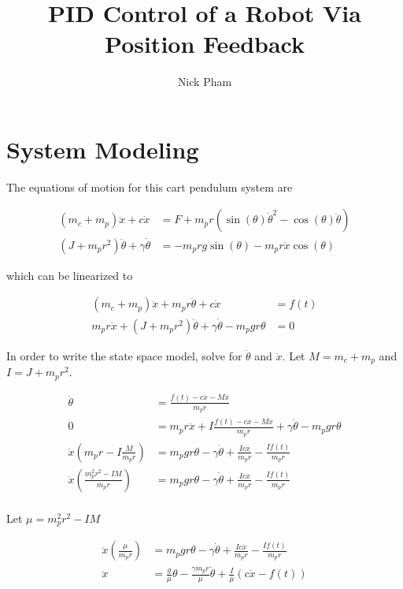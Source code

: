 \documentclass{journal}
\title{PID Control of a Robot Via Position Feedback}
\author{Nick Pham}
\begin{document}

\maketitle

\section*{System Modeling}
The equations of motion for this cart pendulum system are

\begin{align*}
	(m_c + m_p)\ddot{x} + c \dot{x} &= F + m_p r \left( \sin (\theta) \dot{\theta}^2 - \cos (\theta) \ddot{\theta} \right) \\
	\left(J + m_p r^2 \right) \ddot{\theta} + \gamma \dot{\theta} &= -m_p r g \sin (\theta) - m_p r \ddot{x} \cos (\theta)
\end{align*}

which can be linearized to 

\begin{align*}
	(m_c + m_p) \ddot{x} + m_p r \ddot{\theta} + c\dot{x} &= f(t) \\
	m_p r \ddot{x} + \left( J + m_p r^2 \right) \ddot{\theta} + \gamma \dot{\theta} - m_p g r \theta &= 0
\end{align*}

In order to write the state space model, solve for $\ddot{\theta}$ and $\ddot{x}$. Let $M = m_c + m_p$ and $I = J + m_p r^2$.

\begin{align*}
	\ddot{\theta} &= \frac{f(t) - c \dot{x} - M\ddot{x}}{m_p r} \\
	0 &= m_p r \ddot{x} + I \frac{f(t) - c \dot{x} - M\ddot{x}}{m_p r} + \gamma \dot{\theta} - m_p g r \theta \\
	\ddot{x} \left( m_p r - I \frac{M}{m_p r} \right) &= m_p g r \theta - \gamma \dot{\theta} + \frac{Ic \dot{x}}{m_p r} - \frac{I f(t)}{m_p r} \\
	\ddot{x} \left(\frac{m_p^2 r^2 - IM}{m_p r} \right) &= m_p g r \theta - \gamma \dot{\theta} + \frac{Ic \dot{x}}{m_p r} - \frac{I f(t)}{m_p r} \\
\end{align*}

Let $\mu = m_p^2 r^2 - IM$

\begin{align*}
	\ddot{x} \left(\frac{\mu}{m_p r} \right) &= m_p g r \theta - \gamma \dot{\theta} + \frac{Ic \dot{x}}{m_p r} - \frac{I f(t)}{m_p r} \\
	\ddot{x} &= \frac{g}{\mu} \theta - \frac{\gamma m_p r}{\mu} \dot{\theta} + \frac{I}{\mu} (c \dot{x} - f(t))
\end{align*}
\end{document}
